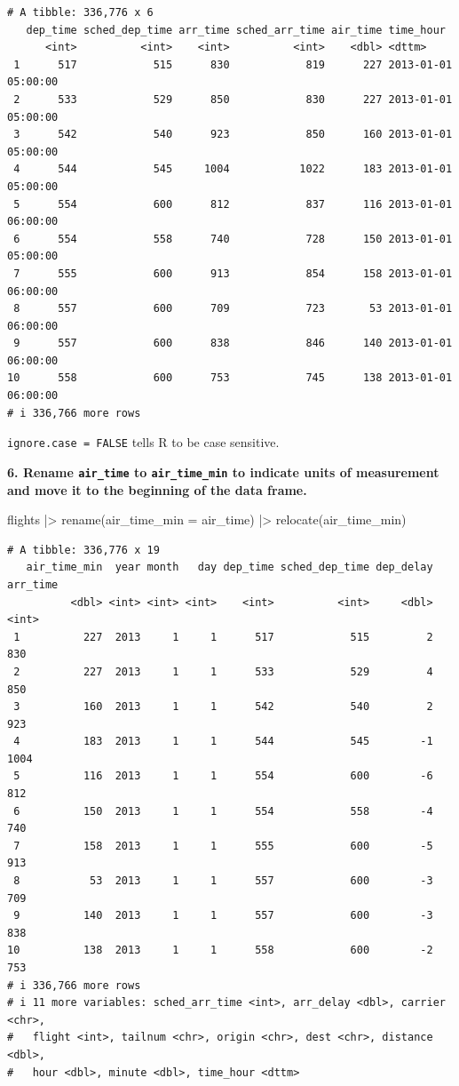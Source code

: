 \documentclass[
  letterpaper,
  DIV=11,
  numbers=noendperiod]{scrreprt}
\newenvironment{Shaded}{\begin{snugshade}}{\end{snugshade}}
\newcommand{\AttributeTok}[1]{\textcolor[rgb]{0.40,0.45,0.13}{#1}}
\newcommand{\FunctionTok}[1]{\textcolor[rgb]{0.28,0.35,0.67}{#1}}
\newcommand{\NormalTok}[1]{\textcolor[rgb]{0.00,0.23,0.31}{#1}}
\newcommand{\SpecialCharTok}[1]{\textcolor[rgb]{0.37,0.37,0.37}{#1}}
\begin{document}
\begin{verbatim}
# A tibble: 336,776 x 6
   dep_time sched_dep_time arr_time sched_arr_time air_time time_hour          
      <int>          <int>    <int>          <int>    <dbl> <dttm>             
 1      517            515      830            819      227 2013-01-01 05:00:00
 2      533            529      850            830      227 2013-01-01 05:00:00
 3      542            540      923            850      160 2013-01-01 05:00:00
 4      544            545     1004           1022      183 2013-01-01 05:00:00
 5      554            600      812            837      116 2013-01-01 06:00:00
 6      554            558      740            728      150 2013-01-01 05:00:00
 7      555            600      913            854      158 2013-01-01 06:00:00
 8      557            600      709            723       53 2013-01-01 06:00:00
 9      557            600      838            846      140 2013-01-01 06:00:00
10      558            600      753            745      138 2013-01-01 06:00:00
# i 336,766 more rows
\end{verbatim}

\texttt{ignore.case\ =\ FALSE} tells R to be case sensitive.

\textbf{6. Rename \texttt{air\_time} to \texttt{air\_time\_min} to
indicate units of measurement and move it to the beginning of the data
frame.}

\begin{Shaded}
\begin{Highlighting}[]
\NormalTok{flights }\SpecialCharTok{|\textgreater{}}
  \FunctionTok{rename}\NormalTok{(}\AttributeTok{air\_time\_min =}\NormalTok{ air\_time) }\SpecialCharTok{|\textgreater{}}
  \FunctionTok{relocate}\NormalTok{(air\_time\_min)}
\end{Highlighting}
\end{Shaded}

\begin{verbatim}
# A tibble: 336,776 x 19
   air_time_min  year month   day dep_time sched_dep_time dep_delay arr_time
          <dbl> <int> <int> <int>    <int>          <int>     <dbl>    <int>
 1          227  2013     1     1      517            515         2      830
 2          227  2013     1     1      533            529         4      850
 3          160  2013     1     1      542            540         2      923
 4          183  2013     1     1      544            545        -1     1004
 5          116  2013     1     1      554            600        -6      812
 6          150  2013     1     1      554            558        -4      740
 7          158  2013     1     1      555            600        -5      913
 8           53  2013     1     1      557            600        -3      709
 9          140  2013     1     1      557            600        -3      838
10          138  2013     1     1      558            600        -2      753
# i 336,766 more rows
# i 11 more variables: sched_arr_time <int>, arr_delay <dbl>, carrier <chr>,
#   flight <int>, tailnum <chr>, origin <chr>, dest <chr>, distance <dbl>,
#   hour <dbl>, minute <dbl>, time_hour <dttm>
\end{verbatim}
\end{document}

